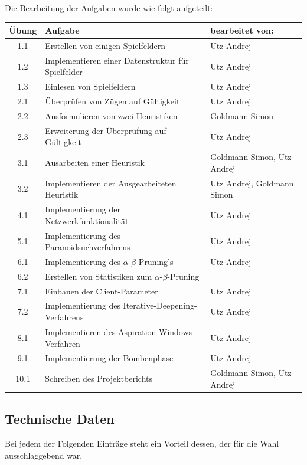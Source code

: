 \documentclass[12pt,a4paper]{article}
\begin{document}
Die Bearbeitung der Aufgaben wurde wie folgt aufgeteilt:\newline
\begin{tabular}{|c|l|l|}
	\hline
	Übung & Aufgabe & bearbeitet von:\\
	\hline
	1.1 & Erstellen von einigen Spielfeldern & Utz Andrej\\
	1.2 & Implementieren einer Datenstruktur für Spielfelder & Utz Andrej\\
	1.3 & Einlesen von Spielfeldern & Utz Andrej\\
	\hline
	2.1 & Überprüfen von Zügen auf Gültigkeit & Utz Andrej\\
	2.2 & Ausformulieren von zwei Heuristiken & Goldmann Simon\\
	2.3 & Erweiterung der Überprüfung auf Gültigkeit & Utz Andrej\\
	\hline
	3.1 & Ausarbeiten einer Heuristik & Goldmann Simon, Utz Andrej\\
	3.2 & Implementieren der Ausgearbeiteten Heuristik & Utz Andrej, Goldmann Simon\\
	\hline
	4.1 & Implementierung der Netzwerkfunktionalität & Utz Andrej\\
	\hline
	5.1 & Implementierung des Paranoidsuchverfahrens & Utz Andrej\\
	\hline
	6.1 & Implementierung des $\alpha$-$\beta$-Pruning's & Utz Andrej\\
	6.2 & Erstellen von Statistiken zum $\alpha$-$\beta$-Pruning & \\
	\hline
	7.1 & Einbauen der Client-Parameter & Utz Andrej\\
	7.2 & Implementierung des Iterative-Deepening-Verfahrens & Utz Andrej\\
	\hline
	8.1 & Implementieren des Aspiration-Windows-Verfahren & Utz Andrej\\
	\hline
	9.1 & Implementierung der Bombenphase & Utz Andrej\\
	\hline
	10.1 & Schreiben des Projektberichts & Goldmann Simon, Utz Andrej\\
	\hline
\end{tabular}
\newpage

\subsection{Technische Daten}
Bei jedem der Folgenden Einträge steht ein Vorteil dessen, der für die Wahl ausschlaggebend war.
\end{document}
